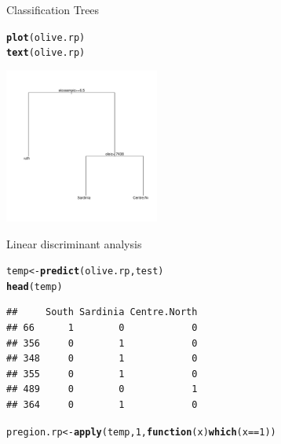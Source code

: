 \documentclass[10pt,xcolor=dvipsnames]{beamer}\usepackage[]{graphicx}\usepackage[]{color}
\makeatletter
\newcommand{\hlnum}[1]{\textcolor[rgb]{0.686,0.059,0.569}{#1}}%
\newcommand{\hlopt}[1]{\textcolor[rgb]{0,0,0}{#1}}%
\newcommand{\hlstd}[1]{\textcolor[rgb]{0.345,0.345,0.345}{#1}}%
\newcommand{\hlkwa}[1]{\textcolor[rgb]{0.161,0.373,0.58}{\textbf{#1}}}%
\newcommand{\hlkwb}[1]{\textcolor[rgb]{0.69,0.353,0.396}{#1}}%
\newcommand{\hlkwc}[1]{\textcolor[rgb]{0.333,0.667,0.333}{#1}}%
\newcommand{\hlkwd}[1]{\textcolor[rgb]{0.737,0.353,0.396}{\textbf{#1}}}%
\newenvironment{kframe}{%
 \def\at@end@of@kframe{}%
 \ifinner\ifhmode%
  \def\at@end@of@kframe{\end{minipage}}%
  \begin{minipage}{\columnwidth}%
 \fi\fi%
 \def\FrameCommand##1{\hskip\@totalleftmargin \hskip-\fboxsep
 \colorbox{shadecolor}{##1}\hskip-\fboxsep
     \hskip-\linewidth \hskip-\@totalleftmargin \hskip\columnwidth}%
 \MakeFramed {\advance\hsize-\width
   \@totalleftmargin\z@ \linewidth\hsize
   \@setminipage}}%
 {\par\unskip\endMakeFramed%
 \at@end@of@kframe}
\newenvironment{knitrout}{}{} %
\makeatother
\begin{document}
\begin{frame}[fragile]{Classification Trees}
\begin{knitrout}\footnotesize
{}\color{fgcolor}\begin{kframe}
\begin{alltt}
\hlkwd{plot}\hlstd{(olive.rp)}
\hlkwd{text}\hlstd{(olive.rp)}
\end{alltt}
\end{kframe}

{\centering \includegraphics[width=2in]{figure/treesPlot-1} 

}



\end{knitrout}
\end{frame}

\begin{frame}[fragile]{Linear discriminant analysis}
\begin{knitrout}\footnotesize
{}\color{fgcolor}\begin{kframe}
\begin{alltt}
\hlstd{temp} \hlkwb{<-} \hlkwd{predict}\hlstd{(olive.rp, test)}
\hlkwd{head}\hlstd{(temp)}
\end{alltt}
\begin{verbatim}
##     South Sardinia Centre.North
## 66      1        0            0
## 356     0        1            0
## 348     0        1            0
## 355     0        1            0
## 489     0        0            1
## 364     0        1            0
\end{verbatim}
\begin{alltt}
\hlstd{pregion.rp} \hlkwb{<-} \hlkwd{apply}\hlstd{(temp,} \hlnum{1}\hlstd{,} \hlkwa{function}\hlstd{(}\hlkwc{x}\hlstd{)} \hlkwd{which}\hlstd{(x}\hlopt{==}\hlnum{1}\hlstd{))}
\end{alltt}
\end{kframe}
\end{knitrout}
\end{frame}
\end{document}
